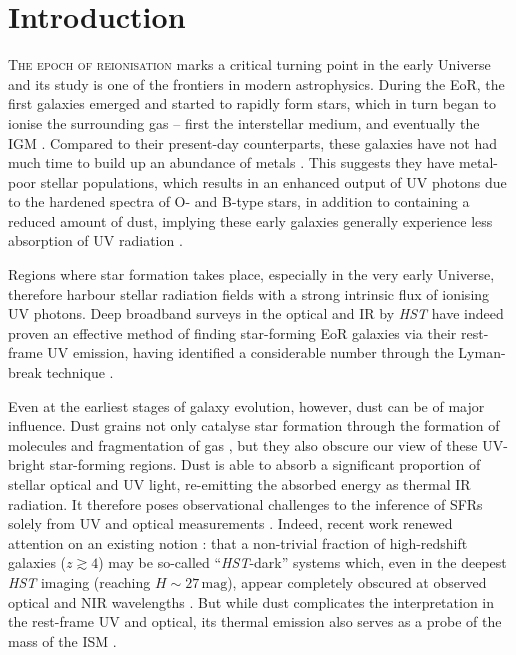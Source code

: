 \newpage

\section{Introduction}
\label{chDsec:Introduction}

\lettrine{T}{he epoch of reionisation} marks a critical turning point in the early Universe and its study is one of the frontiers in modern astrophysics. During the EoR, the first galaxies emerged and started to rapidly form stars, which in turn began to ionise the surrounding gas -- first the interstellar medium, and eventually the IGM \citep{2018PhR...780....1D, 2021arXiv211013160R}. Compared to their present-day counterparts, these galaxies have not had much time to build up an abundance of metals . This suggests they have metal-poor stellar populations, which results in an enhanced output of UV photons due to the hardened spectra of O- and B-type stars, in addition to containing a reduced amount of dust, implying these early galaxies generally experience less absorption of UV radiation \citep{2016ARA&A..54..761S}.

Regions where star formation takes place, especially in the very early Universe, therefore harbour stellar radiation fields with a strong intrinsic flux of ionising UV photons. Deep broadband surveys in the optical and IR by \textit{HST} have indeed proven an effective method of finding star-forming EoR galaxies via their rest-frame UV emission, having identified a considerable number through the Lyman-break technique \citep[currently nearly \num{2000} candidates at $z \geq 6$; see e.g.][]{2021AJ....162...47B}.

Even at the earliest stages of galaxy evolution, however, dust can be of major influence. Dust grains not only catalyse star formation through the formation of molecules \citep{2018MNRAS.474.1545C} and fragmentation of gas \citep{2006MNRAS.369.1437S}, but they also obscure our view of these UV-bright star-forming regions. Dust is able to absorb a significant proportion of stellar optical and UV light, re-emitting the absorbed energy as thermal IR radiation. It therefore poses observational challenges to the inference of SFRs solely from UV and optical measurements \citep{2012ARA&A..50..531K, 2014ARA&A..52..415M, 2020ApJ...902..112B}. Indeed, recent work renewed attention on an existing notion \citep{2020RSOS....700556H}: that a non-trivial fraction of high-redshift galaxies ($z \gtrsim 4$) may be so-called ``\textit{HST}-dark'' systems which, even in the deepest \textit{HST} imaging (reaching $H \sim 27 \, \mathrm{mag}$), appear completely obscured at observed optical and NIR wavelengths \citep{2018A&A...620A.152F, 2019ApJ...884..154W, 2019Natur.572..211W, 2021Natur.597..489F, 2021ApJ...923..215C, 2022ApJ...925...23M}. But while dust complicates the interpretation in the rest-frame UV and optical, its thermal emission also serves as a probe of the mass of the ISM \citep[e.g.][]{2017ApJ...837..150S}.

